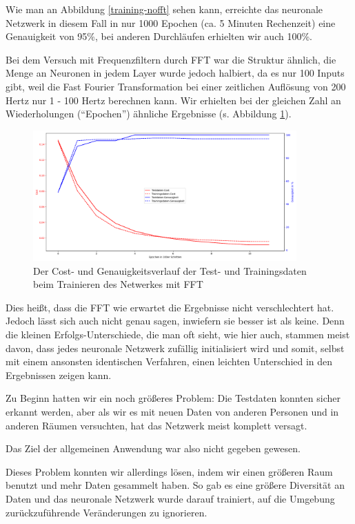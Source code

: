 \documentclass{scrartcl}
\begin{document}
	Wie man an Abbildung \ref{training-nofft} sehen kann, erreichte das neuronale Netzwerk in diesem Fall in nur 1000 Epochen (ca. 5 Minuten Rechenzeit) eine Genauigkeit von 95\%, bei anderen Durchläufen erhielten wir auch 100\%.

	Bei dem Versuch mit Frequenzfiltern durch FFT war die Struktur ähnlich, die Menge an Neuronen in jedem Layer wurde jedoch halbiert, da es nur 100 Inputs gibt, weil die Fast Fourier Transformation bei einer zeitlichen Auflösung von 200 Hertz nur 1 - 100 Hertz berechnen kann. Wir erhielten bei der gleichen Zahl an Wiederholungen (\enquote{Epochen}) ähnliche Ergebnisse (s. Abbildung \ref{training-fft}).

	\begin{figure}[h!]
		\includegraphics[width=0.9\textwidth]{pictures/training-fft2.png}
		\caption{Der Cost- und Genauigkeitsverlauf der Test- und Trainingsdaten beim Trainieren des Netwerkes mit FFT}
		\label{training-fft}
	\end{figure}

	Dies heißt, dass die FFT wie erwartet die Ergebnisse nicht verschlechtert hat. Jedoch lässt sich auch nicht genau sagen, inwiefern sie besser ist als keine. Denn die kleinen Erfolgs-Unterschiede, die man oft sieht, wie hier auch, stammen meist davon, dass jedes neuronale Netzwerk zufällig initialisiert wird und somit, selbst mit einem ansonsten identischen Verfahren, einen leichten Unterschied in den Ergebnissen zeigen kann.

	Zu Beginn hatten wir ein noch größeres Problem: Die Testdaten konnten sicher erkannt werden, aber als wir es mit neuen Daten von anderen Personen und in anderen Räumen versuchten, hat das Netzwerk meist komplett versagt.

	Das Ziel der allgemeinen Anwendung war also nicht gegeben gewesen. 

	Dieses Problem konnten wir allerdings lösen, indem wir einen größeren Raum benutzt und mehr Daten gesammelt haben. So gab es eine größere Diversität an Daten und das neuronale Netzwerk wurde darauf trainiert, auf die Umgebung zurückzuführende Veränderungen zu ignorieren.
\end{document}
